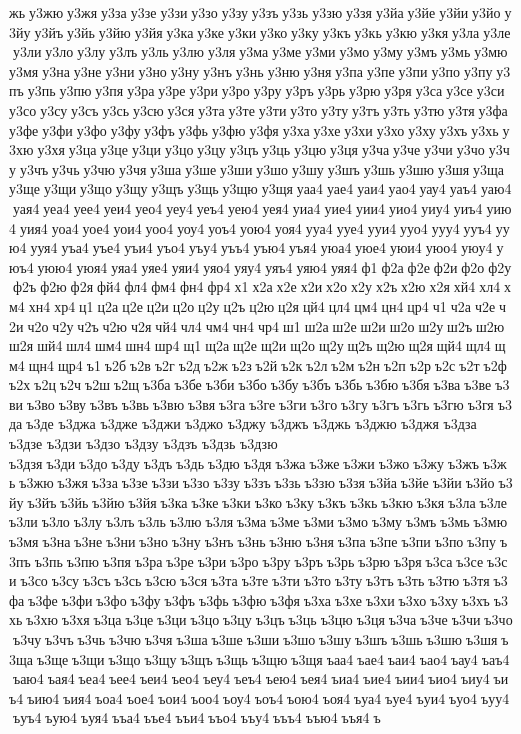 жь у3жю у3жя у3за у3зе у3зи у3зо у3зу у3зъ у3зь у3зю у3зя у3йа у3йе у3йи у3йо у3йу у3йъ у3йь у3йю у3йя у3ка у3ке у3ки у3ко у3ку у3къ у3кь у3кю у3кя у3ла у3ле у3ли у3ло у3лу у3лъ у3ль у3лю у3ля у3ма у3ме у3ми у3мо у3му у3мъ у3мь у3мю у3мя у3на у3не у3ни у3но у3ну у3нъ у3нь у3ню у3ня у3па у3пе у3пи у3по у3пу у3пъ у3пь у3пю у3пя у3ра у3ре у3ри у3ро у3ру у3ръ у3рь у3рю у3ря у3са у3се у3си у3со у3су у3съ у3сь у3сю у3ся у3та у3те у3ти у3то у3ту у3тъ у3ть у3тю у3тя у3фа у3фе у3фи у3фо у3фу у3фъ у3фь у3фю у3фя у3ха у3хе у3хи у3хо у3ху у3хъ у3хь у3хю у3хя у3ца у3це у3ци у3цо у3цу у3цъ у3ць у3цю у3ця у3ча у3че у3чи у3чо у3чу у3чъ у3чь у3чю у3чя у3ша у3ше у3ши у3шо у3шу у3шъ у3шь у3шю у3шя у3ща у3ще у3щи у3що у3щу у3щъ у3щь у3щю у3щя уаа4 уае4 уаи4 уао4 уау4 уаъ4 уаю4 уая4 уеа4 уее4 уеи4 уео4 уеу4 уеъ4 уею4 уея4 уиа4 уие4 уии4 уио4 уиу4 уиъ4 уию4 уия4 уоа4 уое4 уои4 уоо4 уоу4 уоъ4 уою4 уоя4 ууа4 ууе4 ууи4 ууо4 ууу4 ууъ4 уую4 ууя4 уъа4 уъе4 уъи4 уъо4 уъу4 уъъ4 уъю4 уъя4 уюа4 уюе4 уюи4 уюо4 уюу4 уюъ4 уюю4 уюя4 уяа4 уяе4 уяи4 уяо4 уяу4 уяъ4 уяю4 уяя4 ф1 ф2а ф2е ф2и ф2о ф2у ф2ъ ф2ю ф2я фй4 фл4 фм4 фн4 фр4 х1 х2а х2е х2и х2о х2у х2ъ х2ю х2я хй4 хл4 хм4 хн4 хр4 ц1 ц2а ц2е ц2и ц2о ц2у ц2ъ ц2ю ц2я цй4 цл4 цм4 цн4 цр4 ч1 ч2а ч2е ч2и ч2о ч2у ч2ъ ч2ю ч2я чй4 чл4 чм4 чн4 чр4 ш1 ш2а ш2е ш2и ш2о ш2у ш2ъ ш2ю ш2я шй4 шл4 шм4 шн4 шр4 щ1 щ2а щ2е щ2и щ2о щ2у щ2ъ щ2ю щ2я щй4 щл4 щм4 щн4 щр4 ъ1 ъ2б ъ2в ъ2г ъ2д ъ2ж ъ2з ъ2й ъ2к ъ2л ъ2м ъ2н ъ2п ъ2р ъ2с ъ2т ъ2ф ъ2х ъ2ц ъ2ч ъ2ш ъ2щ ъ3ба ъ3бе ъ3би ъ3бо ъ3бу ъ3бъ ъ3бь ъ3бю ъ3бя ъ3ва ъ3ве ъ3ви ъ3во ъ3ву ъ3въ ъ3вь ъ3вю ъ3вя ъ3га ъ3ге ъ3ги ъ3го ъ3гу ъ3гъ ъ3гь ъ3гю ъ3гя ъ3да ъ3де 	ъ3джа 	ъ3дже 	ъ3джи 	ъ3джо 	ъ3джу 	ъ3джъ 	ъ3джь 	ъ3джю 	ъ3джя 	ъ3дза 	ъ3дзе 	ъ3дзи 	ъ3дзо 	ъ3дзу 	ъ3дзъ 	ъ3дзь 	ъ3дзю 	ъ3дзя ъ3ди ъ3до ъ3ду ъ3дъ ъ3дь ъ3дю ъ3дя ъ3жа ъ3же ъ3жи ъ3жо ъ3жу ъ3жъ ъ3жь ъ3жю ъ3жя ъ3за ъ3зе ъ3зи ъ3зо ъ3зу ъ3зъ ъ3зь ъ3зю ъ3зя ъ3йа ъ3йе ъ3йи ъ3йо ъ3йу ъ3йъ ъ3йь ъ3йю ъ3йя ъ3ка ъ3ке ъ3ки ъ3ко ъ3ку ъ3къ ъ3кь ъ3кю ъ3кя ъ3ла ъ3ле ъ3ли ъ3ло ъ3лу ъ3лъ ъ3ль ъ3лю ъ3ля ъ3ма ъ3ме ъ3ми ъ3мо ъ3му ъ3мъ ъ3мь ъ3мю ъ3мя ъ3на ъ3не ъ3ни ъ3но ъ3ну ъ3нъ ъ3нь ъ3ню ъ3ня ъ3па ъ3пе ъ3пи ъ3по ъ3пу ъ3пъ ъ3пь ъ3пю ъ3пя ъ3ра ъ3ре ъ3ри ъ3ро ъ3ру ъ3ръ ъ3рь ъ3рю ъ3ря ъ3са ъ3се ъ3си ъ3со ъ3су ъ3съ ъ3сь ъ3сю ъ3ся ъ3та ъ3те ъ3ти ъ3то ъ3ту ъ3тъ ъ3ть ъ3тю ъ3тя ъ3фа ъ3фе ъ3фи ъ3фо ъ3фу ъ3фъ ъ3фь ъ3фю ъ3фя ъ3ха ъ3хе ъ3хи ъ3хо ъ3ху ъ3хъ ъ3хь ъ3хю ъ3хя ъ3ца ъ3це ъ3ци ъ3цо ъ3цу ъ3цъ ъ3ць ъ3цю ъ3ця ъ3ча ъ3че ъ3чи ъ3чо ъ3чу ъ3чъ ъ3чь ъ3чю ъ3чя ъ3ша ъ3ше ъ3ши ъ3шо ъ3шу ъ3шъ ъ3шь ъ3шю ъ3шя ъ3ща ъ3ще ъ3щи ъ3що ъ3щу ъ3щъ ъ3щь ъ3щю ъ3щя ъаа4 ъае4 ъаи4 ъао4 ъау4 ъаъ4 ъаю4 ъая4 ъеа4 ъее4 ъеи4 ъео4 ъеу4 ъеъ4 ъею4 ъея4 ъиа4 ъие4 ъии4 ъио4 ъиу4 ъиъ4 ъию4 ъия4 ъоа4 ъое4 ъои4 ъоо4 ъоу4 ъоъ4 ъою4 ъоя4 ъуа4 ъуе4 ъуи4 ъуо4 ъуу4 ъуъ4 ъую4 ъуя4 ъъа4 ъъе4 ъъи4 ъъо4 ъъу4 ъъъ4 ъъю4 ъъя4 ъ